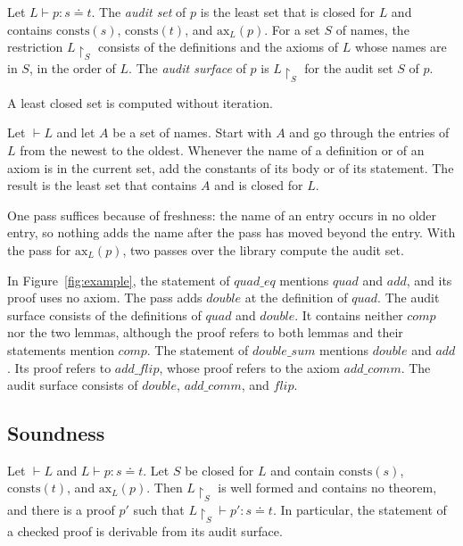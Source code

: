 \documentclass[acmsmall,nonacm,screen]{acmart}
\newcommand{\eqd}{\doteq}
\newcommand{\nm}[1]{\mathit{#1}}
\newcommand{\chk}[4]{#1 \vdash #2 : #3 \eqd #4}
\newcommand{\wf}[1]{\vdash #1}
\newcommand{\consts}{\mathrm{consts}}
\newcommand{\axs}{\mathrm{ax}}
\newcommand{\restr}[2]{#1{\restriction}_{#2}}
\begin{document}
\begin{definition}
\label{def:audit}
Let $\chk{L}{p}{s}{t}$. The \emph{audit set} of $p$ is the least set that is closed for $L$ and
contains $\consts(s)$, $\consts(t)$, and $\axs_L(p)$. For a set $S$ of names, the restriction
$\restr{L}{S}$ consists of the definitions and the axioms of $L$ whose names are in $S$, in the
order of $L$. The \emph{audit surface} of $p$ is $\restr{L}{S}$ for the audit set $S$ of $p$.
\end{definition}

A least closed set is computed without iteration.

\begin{proposition}
\label{prop:pass}
Let $\wf{L}$ and let $A$ be a set of names. Start with $A$ and go through the entries of $L$
from the newest to the oldest. Whenever the name of a definition or of an axiom is in the current
set, add the constants of its body or of its statement. The result is the least set that contains
$A$ and is closed for $L$.
\end{proposition}

One pass suffices because of freshness: the name of an entry occurs in no older entry, so nothing
adds the name after the pass has moved beyond the entry. With the pass for $\axs_L(p)$, two
passes over the library compute the audit set.

In Figure~\ref{fig:example}, the statement of $\nm{quad\_eq}$ mentions $\nm{quad}$ and
$\nm{add}$, and its proof uses no axiom. The pass adds $\nm{double}$ at the definition of
$\nm{quad}$. The audit surface consists of the definitions of $\nm{quad}$ and $\nm{double}$. It
contains neither $\nm{comp}$ nor the two lemmas, although the proof refers to both lemmas and
their statements mention $\nm{comp}$. The statement of $\nm{double\_sum}$ mentions $\nm{double}$
and $\nm{add}$. Its proof refers to $\nm{add\_flip}$, whose proof refers to the axiom
$\nm{add\_comm}$. The audit surface consists of $\nm{double}$, $\nm{add\_comm}$, and $\nm{flip}$.

\subsection{Soundness}

\begin{theorem}
\label{thm:audit}
Let $\wf{L}$ and $\chk{L}{p}{s}{t}$. Let $S$ be closed for $L$ and contain $\consts(s)$,
$\consts(t)$, and $\axs_L(p)$. Then $\restr{L}{S}$ is well formed and contains no theorem, and
there is a proof $p'$ such that $\chk{\restr{L}{S}}{p'}{s}{t}$. In particular, the statement of
a checked proof is derivable from its audit surface.
\end{theorem}
\end{document}
